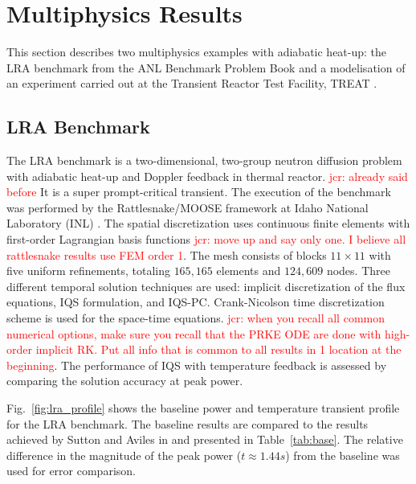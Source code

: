 \documentclass{elsarticle}
\newcommand{\fig}[1]{Fig.~\ref{#1}}                      %
\newcommand{\tbl}[1]{Table~\ref{#1}}                     %
\newcommand{\iqspc}{IQS-PC\xspace}
\newcommand{\jcr}[1]{\textcolor{red}{jcr: #1}}
\begin{document}
\section{Multiphysics Results}

This section describes two multiphysics examples with adiabatic heat-up: the LRA benchmark from the  ANL Benchmark Problem Book \cite{ANL_BPB} 
and a modelisation of an experiment carried out at the Transient Reactor Test Facility, TREAT \cite{mammoth, Tran15}. 

\subsection{LRA Benchmark}

The LRA benchmark is a two-dimensional, two-group neutron diffusion problem with adiabatic heat-up and Doppler feedback in thermal reactor.  
\jcr{already said before}
It is a super prompt-critical transient. The execution of the benchmark was performed by the Rattlesnake/MOOSE framework at Idaho National Laboratory (INL) \cite{wang2013}.  The spatial discretization uses continuous finite elements with first-order Lagrangian basis functions \jcr{move up and say only one. I believe all rattlesnake results use FEM order 1}. The mesh consists of blocks $11\times 11$ with five uniform refinements, totaling $165,165$ elements and $124,609$ nodes. Three different temporal solution techniques are used: implicit discretization of the flux equations, IQS formulation, and \iqspc. Crank-Nicolson time discretization scheme is used for the space-time equations. \jcr{when you recall all common numerical options, make sure you recall that the PRKE ODE are done with high-order implicit RK. Put all info that is common to all results in 1 location at the beginning}. The performance of IQS with temperature feedback is assessed by comparing the solution accuracy at peak power.

\fig{fig:lra_profile} shows the baseline power and temperature transient profile for the LRA benchmark. The baseline results are compared to the results achieved by Sutton and Aviles in \cite{Sutton_1996} and presented in \tbl{tab:base}.  The relative difference in the magnitude of the peak power ($t\approx1.44 s$) from the baseline was used for error comparison.  
\end{document}
